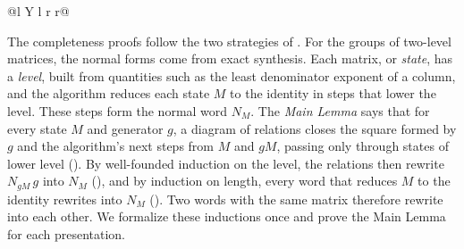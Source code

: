 \documentclass[acmsmall,nonacm,11pt,screen]{acmart}
\begin{document}
\begin{table}[H]
\begin{tabularx}{\linewidth}{@{}l Y l r r@{}}
\bottomrule
\end{tabularx}
\captionsetup{position=bottom}
\caption{Completeness and minimality results formalized in QCert. A presentation gives generators and relations for a whole group, and a sub-presentation for the subgroup generated by the gate set named in the Object column of the Circuits block. $L_n$ is the group of orthogonal matrices $N/\sqrt2^{\,j}$, where $N$ is an integer matrix and $j \ge 0$. Mod denotes the number of Agda modules, the units that Agda checks one at a time. Time records their typechecking time in seconds from scratch, measured with Agda~2.8 on an Intel Core i5-14400. Mod and Time consider only each row's own modules, not the shared library or the formalizations it builds on.}
\label{tab:corpus}
\end{table}

\vspace{-.4 cm}


The completeness proofs follow the two strategies of . For the groups of two-level matrices, the normal forms come from exact synthesis. Each matrix, or \emph{state}, has a \emph{level}, built from quantities such as the least denominator exponent of a column, and the algorithm reduces each state $M$ to the identity in steps that lower the level. These steps form the normal word $N_M$. The \emph{Main Lemma} says that for every state $M$ and generator $g$, a diagram of relations closes the square formed by $g$ and the algorithm's next steps from $M$ and $gM$, passing only through states of lower level (). By well-founded induction on the level, the relations then rewrite $N_{gM}\,g$ into $N_M$ (), and by induction on length, every word that reduces $M$ to the identity rewrites into $N_M$ (). Two words with the same matrix therefore rewrite into each other. We formalize these inductions once and prove the Main Lemma for each presentation.
\end{document}

